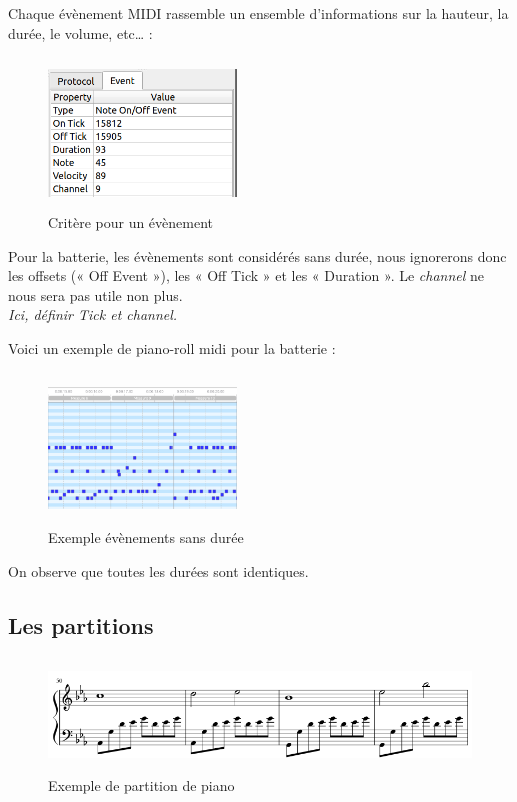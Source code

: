 Chaque évènement MIDI rassemble un ensemble d’informations sur la hauteur, la durée, le volume, etc… :
\begin{figure}[h!]
	\centering
	\includegraphics[height=40mm, width=50mm]{z_images/1_contexte/3_evenements_midi.png}
	\caption{Critère pour un évènement}
\end{figure} %
{}

Pour la batterie, les évènements sont considérés sans durée, nous ignorerons donc les offsets (« Off Event »), les « Off Tick » et les « Duration ». Le \textit{channel} ne nous sera pas utile non plus.\\
\textit{Ici, définir Tick et channel.}

Voici un exemple de piano-roll midi pour la batterie :
\begin{figure}[h!]
	\centering
	\includegraphics[height=40mm, width=50mm]{z_images/1_contexte/4_midi_batterie.png}
	\caption{Exemple évènements sans durée}
\end{figure}

On observe que toutes les durées sont identiques.
\subsection*{Les partitions}
\begin{figure}[h!]
	\centering
	\includegraphics[height=30mm, width=120mm]{z_images/1_contexte/5_partition_piano.png}
	\caption{Exemple de partition de piano}
\end{figure}


